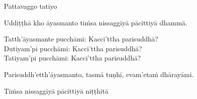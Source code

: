 \begin{center}
  Pattavaggo tatiyo
\end{center}

\medskip

\begin{center}
Uddiṭṭhā kho āyasmanto tiṁsa nissaggiyā pācittiyā dhammā.

\smallskip

Tatth'āyasmante pucchāmi: Kacci'ttha parisuddhā?\\
Dutiyam'pi pucchāmi: Kacci'ttha parisuddhā?\\
Tatiyam'pi pucchāmi: Kacci'ttha parisuddhā?

\smallskip

Parisuddh'etth'āyasmanto, tasmā tuṇhī, evam'etaṁ dhārayāmi.
\end{center}

\begin{outro}
  Tiṁsa nissaggiyā pācittiyā niṭṭhitā
\end{outro}

\clearpage

